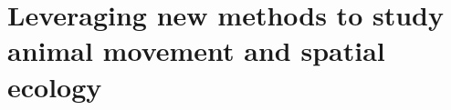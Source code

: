 \documentclass[ twoside,openright,titlepage,numbers=noenddot,%
                headinclude,footinclude,clearpage=empty,abstract=on,
                BCOR=5mm,paper=b5,fontsize=10pt,dvipsnames,toc=flat
                ]{scrbook}
\begin{document}
\raggedright
\nonfrenchspacing
\raggedbottom
\setlength{\parindent}{1.2em}
\pagestyle{plain}


% 



\clearpage

\clearpage

\clearpage

\pagestyle{scrheadings}

\clearpage 

\part{Leveraging new methods to study animal movement and spatial ecology}

\cleardoublepage 

\cleardoublepage 


% 

% 


\end{document}
